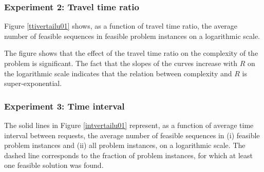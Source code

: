 \documentclass[dissertation,draft*]{aaltoseries}
\begin{document}
\subsubsection{Experiment 2: Travel time ratio}
Figure \ref{ttivertailu01} shows, as a function of travel time ratio, the average number of feasible sequences in feasible problem instances 
on a logarithmic scale.



The figure shows that the effect of the travel time ratio on the complexity of the problem is significant.
The fact that the slopes of the curves increase with $R$ on the logarithmic scale indicates that the relation 
between complexity and $R$ is super-exponential.






\subsubsection{Experiment 3: Time interval}
The solid lines in Figure \ref{intvertailu01} represent, as a function of average time interval 
between requests, the average number of feasible sequences in
(i) feasible problem instances and (ii) all problem instances, on a logarithmic scale.
The dashed line corresponds to the fraction
of problem instances, for which at least one feasible solution was found.

\end{document}
